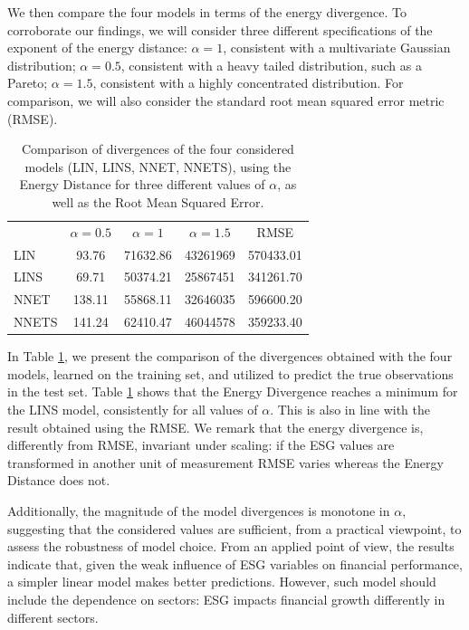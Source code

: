 \documentclass{article}
\begin{document}
We then compare the four models in terms of the energy divergence. To corroborate our findings, we will consider three different specifications of the exponent of the energy distance: $\alpha=1$, consistent with a multivariate Gaussian distribution; 
$\alpha=0.5$, consistent with a heavy tailed distribution, such as a Pareto; $\alpha=1.5$, consistent with a highly concentrated distribution.
For comparison, we will also consider the standard  root mean squared error metric (RMSE).
% 

% 
% 

% 


% 

\begin{table}[!ht]
    \centering
    \begin{tabular}{lcccc}
        \toprule
       & $\alpha=0.5$ & $\alpha=1$& $\alpha=1.5$   & RMSE\\
        LIN  & 93.76 & 71632.86 & 43261969& 570433.01 \\
        LINS & 69.71 & 50374.21& 25867451& 341261.70 \\
        NNET & 138.11 & 55868.11 & 32646035 &596600.20\\
        NNETS & 141.24 &62410.47& 46044578& 359233.40\\
        \bottomrule
    \end{tabular}
    \caption{Comparison of divergences of the four considered models (LIN, LINS, NNET, NNETS), using the Energy Distance for three different values of $\alpha$, as well as  the Root Mean Squared Error. }
    \label{Performances}
\end{table}


In Table \ref{Performances}, we present the comparison of the divergences obtained with the four models, learned on the training set, and utilized to predict the true observations in the test set. 
% 
Table \ref{Performances} shows that  the Energy Divergence reaches a minimum for the LINS model, consistently for all values of $\alpha$. This is also in line with the result obtained  using the RMSE.  We remark that the energy divergence is, differently from RMSE, invariant under scaling: if the ESG values are transformed in another unit of measurement RMSE varies whereas the Energy Distance does  not.
% 

% 
Additionally, the magnitude of the model divergences is monotone in $\alpha$, suggesting that the considered values are sufficient, from a practical viewpoint, to assess the robustness of model choice.  
% 
From an applied point of view, the results indicate that, given the weak influence of ESG variables on financial performance, a simpler linear model makes better predictions. However, such model should include the dependence on sectors: ESG impacts financial growth differently in different sectors.
% 
\end{document}
